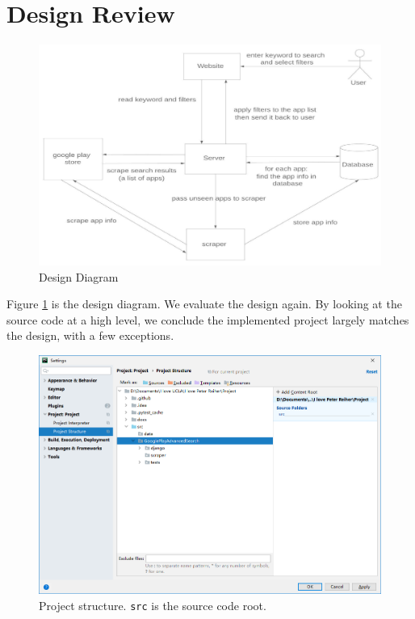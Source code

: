 \documentclass[12pt, a4paper]{article}
\newcommand{\code}[1]{\texttt{#1}}
\begin{document}



\section{Design Review}
\begin{figure}[ht]
\centering
\includegraphics[width=\textwidth]{Context_Diagram.jpeg}
\caption{Design Diagram}
\label{fig:design_diagram}
\end{figure}

Figure \ref{fig:design_diagram} is the design diagram. We evaluate the design again. By looking at the source code at a high level, we conclude the implemented project largely matches the design, with a few exceptions.

\begin{figure}[ht]
\centering
\includegraphics[width=\textwidth]{project-structure.png}
\caption{Project structure. \code{src} is the source code root.}
\label{fig:project-structure}
\end{figure}
\end{document}
